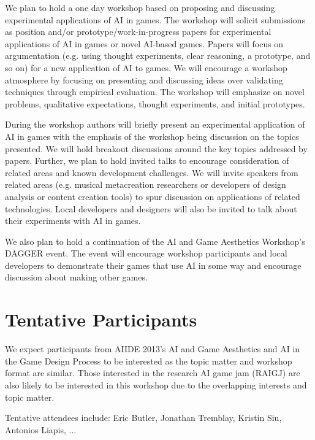 \documentclass[10pt,a4paper]{article}
\begin{document}
We plan to hold a one day workshop based on proposing and discussing experimental applications of AI in games.
The workshop will solicit submissions as position and/or prototype/work-in-progress papers for experimental applications of AI in games or novel AI-based games.
Papers will focus on argumentation (e.g. using thought experiments, clear reasoning, a prototype, and so on) for a new application of AI to games.
We will encourage a workshop atmosphere by focusing on presenting and discussing ideas over validating techniques through empirical evaluation. 
The workshop will emphasize on novel problems, qualitative expectations, thought experiments, and initial prototypes.

During the workshop authors will briefly present an experimental application of AI in games with the emphasis of the workshop being discussion on the topics presented.
We will hold breakout discussions around the key topics addressed by papers.
Further, we plan to hold invited talks to encourage consideration of related areas and known development challenges.
We will invite speakers from related areas (e.g. musical metacreation researchers or developers of design analysis or content creation tools) to spur discussion on applications of related technologies.
Local developers and designers will also be invited to talk about their experiments with AI in games.

We also plan to hold a continuation of the AI and Game Aesthetics Workshop's DAGGER event.
The event will encourage workshop participants and local developers to demonstrate their games that use AI in some way and encourage discussion about making other games.


\section{Tentative Participants}
We expect participants from AIIDE 2013's AI and Game Aesthetics and AI in the Game Design Process to be interested as the topic matter and workshop format are similar.
Those interested in the research AI game jam (RAIGJ) are also likely to be interested in this workshop due to the overlapping interests and topic matter.

Tentative attendees include: Eric Butler, Jonathan Tremblay, Kristin Siu, Antonios Liapis, ...
\end{document}
